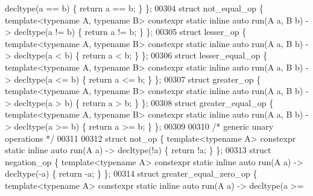 \begin{DoxyCode}
      decltype(a == b)  \{ \textcolor{keywordflow}{return} a == b;  \} \};
00304 \textcolor{keyword}{struct }not\_equal\_op     \{ \textcolor{keyword}{template}<\textcolor{keyword}{typename} A, \textcolor{keyword}{typename} B> constexpr \textcolor{keyword}{static} \textcolor{keyword}{inline} \textcolor{keyword}{auto} run(A a, B b) -> 
      decltype(a != b)  \{ \textcolor{keywordflow}{return} a != b;  \} \};
00305 \textcolor{keyword}{struct }lesser\_op        \{ \textcolor{keyword}{template}<\textcolor{keyword}{typename} A, \textcolor{keyword}{typename} B> constexpr \textcolor{keyword}{static} \textcolor{keyword}{inline} \textcolor{keyword}{auto} run(A a, B b) -> 
      decltype(a < b)   \{ \textcolor{keywordflow}{return} a < b;   \} \};
00306 \textcolor{keyword}{struct }lesser\_equal\_op  \{ \textcolor{keyword}{template}<\textcolor{keyword}{typename} A, \textcolor{keyword}{typename} B> constexpr \textcolor{keyword}{static} \textcolor{keyword}{inline} \textcolor{keyword}{auto} run(A a, B b) -> 
      decltype(a <= b)  \{ \textcolor{keywordflow}{return} a <= b;  \} \};
00307 \textcolor{keyword}{struct }greater\_op       \{ \textcolor{keyword}{template}<\textcolor{keyword}{typename} A, \textcolor{keyword}{typename} B> constexpr \textcolor{keyword}{static} \textcolor{keyword}{inline} \textcolor{keyword}{auto} run(A a, B b) -> 
      decltype(a > b)   \{ \textcolor{keywordflow}{return} a > b;   \} \};
00308 \textcolor{keyword}{struct }greater\_equal\_op \{ \textcolor{keyword}{template}<\textcolor{keyword}{typename} A, \textcolor{keyword}{typename} B> constexpr \textcolor{keyword}{static} \textcolor{keyword}{inline} \textcolor{keyword}{auto} run(A a, B b) -> 
      decltype(a >= b)  \{ \textcolor{keywordflow}{return} a >= b;  \} \};
00309 
00310 \textcolor{comment}{/* generic unary operations */}
00311 
00312 \textcolor{keyword}{struct }not\_op                \{ \textcolor{keyword}{template}<\textcolor{keyword}{typename} A> constexpr \textcolor{keyword}{static} \textcolor{keyword}{inline} \textcolor{keyword}{auto} run(A a) -> decltype(!a)  
          \{ \textcolor{keywordflow}{return} !a;      \} \};
00313 \textcolor{keyword}{struct }negation\_op           \{ \textcolor{keyword}{template}<\textcolor{keyword}{typename} A> constexpr \textcolor{keyword}{static} \textcolor{keyword}{inline} \textcolor{keyword}{auto} run(A a) -> decltype(-a)  
          \{ \textcolor{keywordflow}{return} -a;      \} \};
00314 \textcolor{keyword}{struct }greater\_equal\_zero\_op \{ \textcolor{keyword}{template}<\textcolor{keyword}{typename} A> constexpr \textcolor{keyword}{static} \textcolor{keyword}{inline} \textcolor{keyword}{auto} run(A a) -> decltype(a >= 

\end{DoxyCode}
